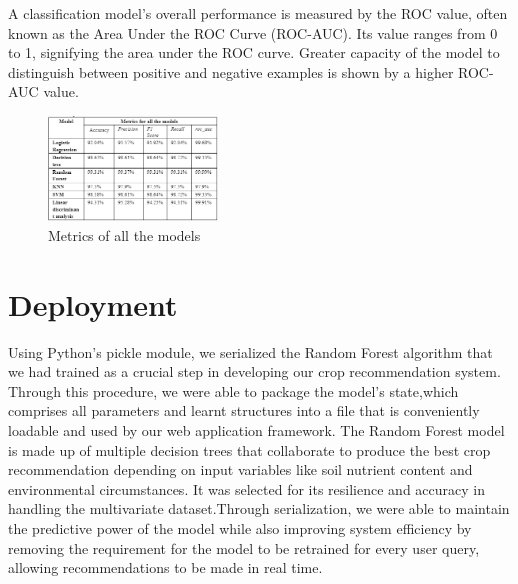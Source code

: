  A classification model's overall performance is measured by the ROC value, often known as the Area Under the ROC Curve (ROC-AUC). Its value ranges from 0 to 1, signifying the area under the ROC curve. Greater capacity of the model to distinguish between positive and negative examples is shown by a higher ROC-AUC value. 





\begin{figure}[h]
    \centering
    \includegraphics[width=0.4\textwidth]{visual 8.png}
    \caption{Metrics of all the models}
    \label{fig:my_label}

\end{figure}


\section{Deployment}


Using Python's pickle module, we serialized the Random Forest algorithm that we had trained as a crucial step in developing our crop recommendation system. Through this procedure, we were able to package the model's state,which comprises all parameters and learnt structures into a file that is conveniently loadable and used by our web application framework. The Random Forest model is made up of multiple decision trees that collaborate to produce the best crop recommendation depending on input variables like soil nutrient content and environmental circumstances. It was selected for its resilience and accuracy in handling the multivariate dataset.Through serialization, we were able to maintain the predictive power of the model while also improving system efficiency by removing the requirement for the model to be retrained for every user query, allowing recommendations to be made in real time.

